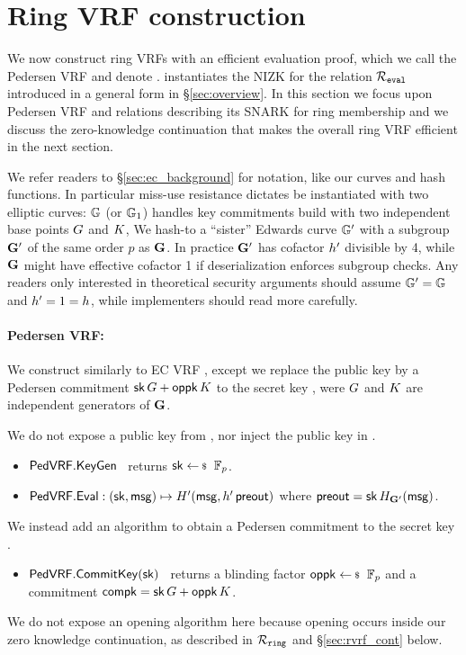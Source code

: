 \section{Ring VRF construction}%
\label{sec:pederson_vrf}

We now construct ring VRFs with an efficient evaluation proof, which
we call the Pedersen VRF and denote \PedVRF.
\PedVRF instantiates the NIZK for the relation $\mathcal{R}_{\mathtt{eval}}$ introduced in a general form in \S\ref{sec:overview}.
In this section we focus upon Pedersen VRF and relations describing its SNARK
for ring membership and we discuss the zero-knowledge continuation
that makes the overall ring VRF efficient in the next section.

We refer readers to \S\ref{sec:ec_background} for notation,
 like our curves and hash functions.
In particular miss-use resistance dictates \PedVRF be instantiated with
two elliptic curves: ${\mathbb{G}}$ (or ${\mathbb{G}}_1$) handles key commitments
 build with two independent base points $G$ and $K$,
We hash-to a ``sister'' Edwards curve ${\mathbb{G}'}$ with a subgroup ${\mathbf{G}'}$
 of the same order $p$ as ${\mathbf{G}}$.
In practice ${\mathbf{G}'}$ has cofactor ${h'}$ divisible by 4, while
 ${\mathbf{G}}$ might have effective cofactor 1 if deserialization enforces subgroup checks.
Any readers only interested in theoretical security arguments
should assume ${\mathbb{G}'} = {\mathbb{G}}$ and ${h'} = 1 = h$,
 while implementers should read more carefully.

\paragraph{Pedersen VRF:} 
We construct \PedVRF similarly to EC VRF
 \cite{nsec5,VXEd25519,draft-irtf-cfrg-vrf-10},
except we replace the public key by a Pedersen commitment
 $\mathsf{sk} \, G + \mathsf{oppk} \, K$ to the secret key \sk,
 were $G$ and $K$ are independent generators of ${\mathbf{G}}$.

We do not expose a public key from \KeyGen, nor inject the public key in \Eval.
\begin{itemize}
    \item ${\mathsf{PedVRF}}.{\mathsf{KeyGen}}$ \, returns $\sk \leftsample \F_p$. %
    \item ${\mathsf{PedVRF}}.{\mathsf{Eval}} : (\mathsf{sk},\mathsf{msg}) \mapsto H'(\mathsf{msg}, {h'}\,{\mathsf{preout}})$ where ${\mathsf{preout}} = \mathsf{sk} \, H_{{\mathbf{G}'}}(\mathsf{msg})$.
\end{itemize}
\noindent We instead add an algorithm to obtain a Pedersen commitment to the secret key \sk.
\begin{itemize}
    \item ${\mathsf{PedVRF}}.{\mathsf{CommitKey}}(\mathsf{sk})$ \,
    returns a blinding factor $\openpk \leftsample \F_p$
    and a commitment $\mathsf{compk} = \mathsf{sk} \, G + \mathsf{oppk} \, K$.
\end{itemize}
We do not expose an opening algorithm here because opening occurs inside
our zero knowledge continuation,
 as described in $\mathcal{R}_{\mathtt{ring}}$ and \S\ref{sec:rvrf_cont} below.

